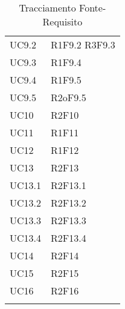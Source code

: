 \begin{longtable} {
		>{\centering}p{28mm}  
		>{}p{20mm}
		}
		UC9.2 & R1F9.2 R3F9.3 \TBstrut \\ [2mm]
		UC9.3 & R1F9.4 \TBstrut \\ [2mm]
		UC9.4 & R1F9.5 \TBstrut \\ [2mm]
		UC9.5 & R2oF9.5 \TBstrut \\ [2mm]
		UC10 & R2F10 \TBstrut \\ [2mm]
		UC11 & R1F11 \TBstrut \\ [2mm]
		UC12 & R1F12 \TBstrut \\ [2mm]
		UC13 & R2F13 \TBstrut \\ [2mm]
		UC13.1 & R2F13.1 \TBstrut \\ [2mm]
		UC13.2 & R2F13.2 \TBstrut \\ [2mm]
		UC13.3 & R2F13.3 \TBstrut \\ [2mm]
		UC13.4 & R2F13.4 \TBstrut \\ [2mm]
		UC14 & R2F14 \TBstrut \\ [2mm]
		UC15 & R2F15 \TBstrut \\ [2mm]
		UC16 & R2F16 \TBstrut \\ [2mm]	
		\rowcolor{white}
		\caption{Tracciamento Fonte-Requisito}
	\end{longtable}

